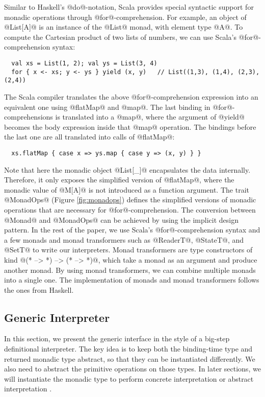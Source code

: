 Similar to Haskell's @do@-notation, Scala provides special syntactic support
for monadic operations through @for@-comprehension.  For example, an object of
@List[A]@ is an instance of the @List@ monad, with element type @A@.
To compute the Cartesian product of two lists of numbers, we can use Scala's
@for@-comprehension syntax:
\begin{lstlisting}
  val xs = List(1, 2); val ys = List(3, 4)
  for { x <- xs; y <- ys } yield (x, y)   // List((1,3), (1,4), (2,3), (2,4))
\end{lstlisting}

The Scala compiler translates the above @for@-comprehension expression into
an equivalent one using @flatMap@ and @map@. The last binding
in @for@-comprehensions is translated into a @map@, where the argument of
@yield@ becomes the body expression inside that @map@ operation. The
bindings before the last one are all translated into calls of @flatMap@:
\begin{lstlisting}
  xs.flatMap { case x => ys.map { case y => (x, y) } }
\end{lstlisting}

Note that here the monadic object @List[_]@ encapsulates the data internally.
Therefore, it only exposes the simplified version of @flatMap@, where the monadic
value of @M[A]@ is not introduced as a function argument. The trait @MonadOps@ (Figure
\ref{fig:monadops}) defines the simplified versions of monadic operations that
are necessary for @for@-comprehension. The conversion between @Monad@ and
@MonadOps@ can be achieved by using the implicit design pattern.
In the rest of the paper, we use Scala's @for@-comprehension syntax and a few
monads and monad transformers such as @ReaderT@, @StateT@, and @SetT@ to
write our interpreters.
Monad transformers are type constructors of kind @(* --> *) --> (* --> *)@, which
take a monad as an argument and produce another monad. By using monad
transformers, we can combine multiple monads into a single one.  The
implementation of monads and monad transformers follows the ones from Haskell.

\subsection{Generic Interpreter} \label{generic_if}

In this section, we present the generic interface in the style of a big-step
definitional interpreter. The key idea is to keep both the binding-time type and
returned monadic type abstract, so that they can be instantiated
differently. We also need to abstract the primitive operations on those types.
In later sections, we will instantiate the monadic type to perform concrete
interpretation \citet{DBLP:conf/popl/LiangHJ95} or abstract interpretation
\cite{Sergey:2013:MAI:2491956.2491979, DBLP:journals/pacmpl/DaraisLNH17}.

